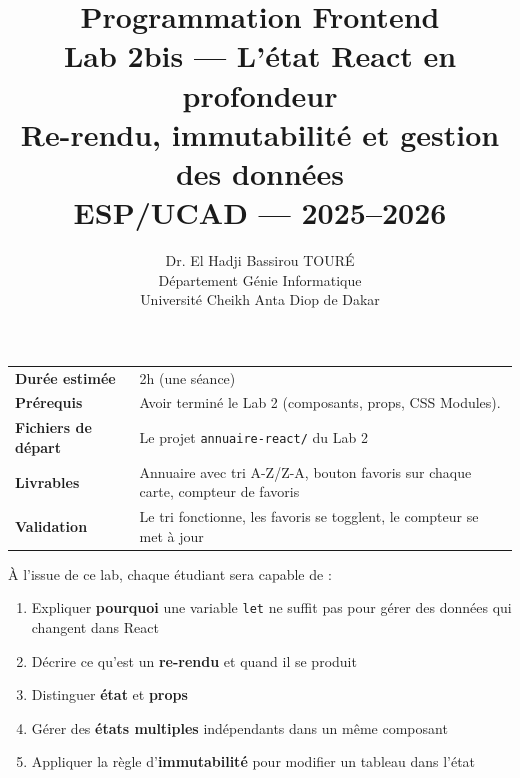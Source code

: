 \documentclass[11pt,a4paper]{article}
\title{%
\vspace{-1cm}
\textbf{\LARGE Programmation Frontend}\\[0.8cm]
\textbf{\huge Lab 2bis --- L'état React en profondeur}\\[0.3cm]
\textbf{\Large Re-rendu, immutabilité et gestion des données}\\[0.5cm]
\large ESP/UCAD --- 2025--2026}
\author{Dr. El Hadji Bassirou TOURÉ\\
Département Génie Informatique\\
Université Cheikh Anta Diop de Dakar}
\date{}
\begin{document}
\maketitle
\thispagestyle{empty}

\vspace{0.5cm}

\begin{prereqbox}
\begin{center}
\begin{tabular}{lp{10cm}}
\toprule
\textbf{Durée estimée} & 2h (une séance) \\
\textbf{Prérequis} & Avoir terminé le Lab 2 (composants, props, CSS Modules). \\
\textbf{Fichiers de départ} & Le projet \texttt{annuaire-react/} du Lab 2 \\
\textbf{Livrables} & Annuaire avec tri A-Z/Z-A, bouton favoris sur chaque carte, compteur de favoris \\
\textbf{Validation} & Le tri fonctionne, les favoris se togglent, le compteur se met à jour \\
\bottomrule
\end{tabular}
\end{center}
\end{prereqbox}

\begin{objectifbox}
À l'issue de ce lab, chaque étudiant sera capable de :
\begin{enumerate}[nosep]
    \item Expliquer \textbf{pourquoi} une variable \texttt{let} ne suffit pas pour gérer des données qui changent dans React
    \item Décrire ce qu'est un \textbf{re-rendu} et quand il se produit
    \item Distinguer \textbf{état} et \textbf{props}
    \item Gérer des \textbf{états multiples} indépendants dans un même composant
    \item Appliquer la règle d'\textbf{immutabilité} pour modifier un tableau dans l'état
\end{enumerate}
\end{objectifbox}

\tableofcontents

\newpage
\end{document}
